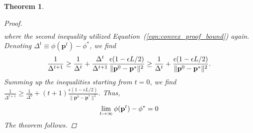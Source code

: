 \documentclass[conference]{IEEEtran}
\newcommand{\1}[1]{\mathds{1}\left[#1\right]}
\theoremstyle{plain}
\newtheorem{theorem}{Theorem}
\newcommand*{\defeq}{\equiv}
\begin{document}
\begin{theorem}
{\begin{proof}
\begin{equation}
\begin{split}
        \end{split}
        \end{equation}
        where the second inequality utilized Equation~(\ref{eqn:convex_proof_bound}) again. Denoting $\Delta^t\defeq\phi(\mathbf{p}^t) - \phi^*$, we find
        \begin{equation}\small
            \frac{1}{\Delta^{t+1}} \geq \frac{1}{\Delta^{t}}+\frac{\Delta^{t}}{\Delta^{t+1}} \frac{\epsilon(1-\epsilon L/2)}{\lVert \mathbf{p}^0 - \mathbf{p}^*\rVert^2} \geq \frac{1}{\Delta^{t}}+ \frac{\epsilon(1-\epsilon L/2)}{\lVert \mathbf{p}^0 - \mathbf{p}^*\rVert^2}.
        \end{equation}
        Summing up the inequalities starting from $t=0$, we find $\frac{1}{\Delta^{t+1}} \geq \frac{1}{\Delta^{0}}+(t+1)\frac{\epsilon(1-\epsilon L/2)}{\lVert \mathbf{p}^0 - \mathbf{p}^*\rVert^2}$. Thus,
        \begin{equation}\small
            \lim_{t\rightarrow \infty} \phi(\mathbf{p}^t) - \phi^*=0
        \end{equation}
        The theorem follows.
    \end{proof}
    }
\end{theorem}
\end{document}
